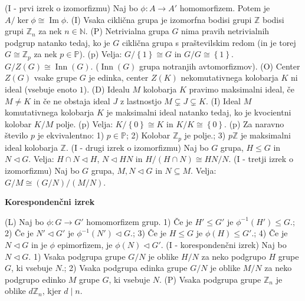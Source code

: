 \documentclass[10pt]{extarticle}
\DeclareMathOperator{\Ima}{Im}
\DeclareMathOperator{\Inn}{Inn}
\begin{document}
        
             (I - prvi izrek o izomorfizmu) Naj bo $\phi:A\to A'$ homomorfizem. Potem je $A/\ker\phi\cong\Ima\phi$.
             (I) Vsaka ciklična grupa je izomorfna bodisi grupi $\mathbb{Z}$ bodisi grupi $\mathbb{Z}_n$ za nek $n\in\mathbb{N}$.
             (P) Netrivialna grupa $G$ nima pravih netrivialnih podgrup natanko tedaj, ko je $G$ ciklična grupa s praštevilskim redom (in je torej $G\cong\mathbb{Z}_p$ za nek $p\in\mathbb{P}$).
             (p) Velja: $G/\left\{1\right\}\cong G$ in $G/G\cong\left\{1\right\}$. ~~ $G/Z(G)\cong\Inn(G)$. ($\Inn(G)$ grupa notranjih avtomorfizmov).
             (O) Center $Z(G)$ vsake grupe $G$ je edinka, center $Z(K)$ nekomutativnega kolobarja $K$ ni ideal (vsebuje enoto $1$).
             (D) Idealu $M$ kolobarja $K$ pravimo maksimalni ideal, če $M\neq K$ in če ne obstaja ideal $J$ z lastnostjo $M\subsetneq J\subsetneq K$.
             (I) Ideal $M$ komutativnega kolobarja $K$ je maksimalni ideal natanko tedaj, ko je kvocientni kolobar $K/M$ polje.
             (p) Velja: $K/\left\{0\right\}\cong K$ in $K/K\cong\left\{0\right\}$.
             (p) Za naravno število $p$ je ekvivalentno: 1) $p\in\mathbb{P}$; 2) Kolobar $\mathbb{Z}_p$ je polje.; 3) $p\mathbb{Z}$ je maksimalni ideal kolobarja $\mathbb{Z}$.
             (I - drugi izrek o izomorfizmu) Naj bo $G$ grupa, $H\leq G$ in $N\triangleleft G$. Velja: $H\cap N \triangleleft H$, $N\triangleleft HN$ in $H/(H\cap N)\cong HN/N$.
             (I - tretji izrek o izomorfizmu) Naj bo $G$ grupa, $M,N\triangleleft G$ in $N\subseteq M$. Velja: $G/M\cong (G/N)/(M/N)$.

    \textbf{Korespondenčni izrek}

        
             (L) Naj bo $\phi:G\to G'$ homomorfizem grup. 1) Če je $H'\leq G'$ je $\phi^{-1}(H')\leq G$.; 2) Če je $N'\triangleleft G'$ je $\phi^{-1}(N')\triangleleft G$.; 3) Če je $H\leq G$ je $\phi(H)\leq G'$.; 4) Če je $N\triangleleft G$ in je $\phi$ epimorfizem, je $\phi(N)\triangleleft G'$.
             (I - korespondenčni izrek) Naj bo $N\triangleleft G$. 1) Vsaka podgrupa grupe $G/N$ je oblike $H/N$ za neko podgrupo $H$ grupe $G$, ki vsebuje $N$.; 2) Vsaka podgrupa edinka grupe $G/N$ je oblike $M/N$ za neko podgrupo edinko $M$ grupe $G$, ki vsebuje $N$.
             (P) Vsaka podgrupa grupe $\mathbb{Z}_n$ je oblike $d\mathbb{Z}_n$, kjer $d\mid n$.
\end{document}
